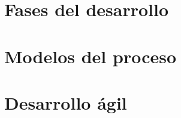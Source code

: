 \localtableofcontents
    \section{Fases del desarrollo}\label{sec:fases-del-desarrollo}
    

    \section{Modelos del proceso}\label{sec:modelos-del-proceso}
    

    \section{Desarrollo ágil}\label{sec:desarrollo-agil}
    

